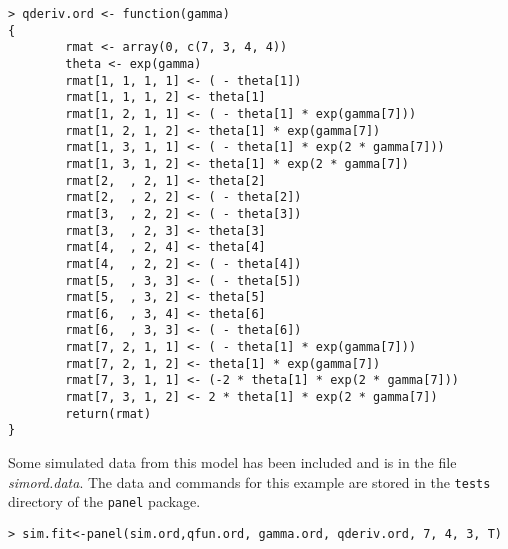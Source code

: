 \documentclass[12pt]{article}
\begin{document}
\begin{verbatim}
> qderiv.ord <- function(gamma)
{
        rmat <- array(0, c(7, 3, 4, 4))
        theta <- exp(gamma)
        rmat[1, 1, 1, 1] <- ( - theta[1])
        rmat[1, 1, 1, 2] <- theta[1]
        rmat[1, 2, 1, 1] <- ( - theta[1] * exp(gamma[7]))
        rmat[1, 2, 1, 2] <- theta[1] * exp(gamma[7])
        rmat[1, 3, 1, 1] <- ( - theta[1] * exp(2 * gamma[7]))
        rmat[1, 3, 1, 2] <- theta[1] * exp(2 * gamma[7])
        rmat[2,  , 2, 1] <- theta[2]
        rmat[2,  , 2, 2] <- ( - theta[2])
        rmat[3,  , 2, 2] <- ( - theta[3])
        rmat[3,  , 2, 3] <- theta[3]
        rmat[4,  , 2, 4] <- theta[4]
        rmat[4,  , 2, 2] <- ( - theta[4])
        rmat[5,  , 3, 3] <- ( - theta[5])
        rmat[5,  , 3, 2] <- theta[5]
        rmat[6,  , 3, 4] <- theta[6]
        rmat[6,  , 3, 3] <- ( - theta[6])
        rmat[7, 2, 1, 1] <- ( - theta[1] * exp(gamma[7]))
        rmat[7, 2, 1, 2] <- theta[1] * exp(gamma[7])
        rmat[7, 3, 1, 1] <- (-2 * theta[1] * exp(2 * gamma[7]))
        rmat[7, 3, 1, 2] <- 2 * theta[1] * exp(2 * gamma[7])
        return(rmat)
}
\end{verbatim}
Some simulated data from this model has been included and is in the file
{\em simord.data}. The data and commands for this example are stored
in the {\tt tests} directory of the {\tt panel} package.
\begin{verbatim}
> sim.fit<-panel(sim.ord,qfun.ord, gamma.ord, qderiv.ord, 7, 4, 3, T)
\end{verbatim}
\end{document}
